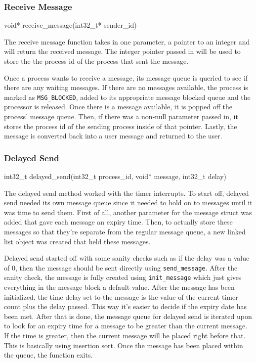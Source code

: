 \documentclass[se]{uw-wkrpt}
\begin{document}
\subsubsection{Receive Message}

\begin{code}
void* receive_message(int32_t* sender_id)
\end{code}

The receive message function takes in one parameter, a pointer to an integer and will return the received message. The integer pointer passed in will be used to store the the process id of the process that sent the message. 

Once a process wants to receive a message, its message queue is queried to see if there are any waiting messages. If there are no messages available, the process is marked as \texttt{MSG\_BLOCKED}, added to its appropriate message blocked queue and the processor is released. Once there is a message available, it is popped off the process' message queue. Then, if there was a non-null parameter passed in, it stores the process id of the sending process inside of that pointer. Lastly, the message is converted back into a user message and returned to the user.

\subsubsection{Delayed Send}

\begin{code}
int32_t delayed_send(int32_t process_id, void* message, int32_t delay)
\end{code}

The delayed send method worked with the timer interrupts. To start off, delayed send needed its own message queue since it needed to hold on to messages until it was time to send them. First of all, another parameter for the message struct was added that gave each message an expiry time. Then, to actually store these messages so that they're separate from the regular message queue, a new linked list object was created that held these messages.

Delayed send started off with some sanity checks such as if the delay was a value of 0, then the message should be sent directly using \texttt{send\_message}. After the sanity check, the message is fully created using \texttt{init\_message} which just gives everything in the message block a default value. After the message has been initialized, the time delay set to the message is the value of the current timer count plus the delay passed. This way it's easier to decide if the expiry date has been met. After that is done, the message queue for delayed send is iterated upon to look for an expiry time for a message to be greater than the current message. If the time is greater, then the current message will be placed right before that. This is basically using insertion sort. Once the message has been placed within the queue, the function exits. 
\end{document}
